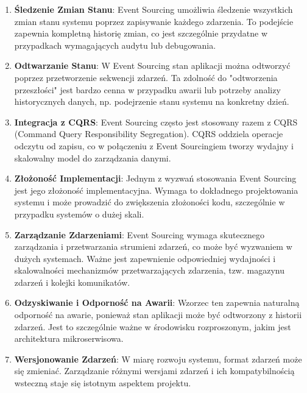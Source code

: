 \begin{enumerate}

    \item \textbf{Śledzenie Zmian Stanu}: Event Sourcing umożliwia śledzenie wszystkich zmian stanu systemu poprzez zapisywanie każdego zdarzenia. To podejście zapewnia kompletną historię zmian, co jest szczególnie przydatne w przypadkach wymagających audytu lub debugowania.

    \item \textbf{Odtwarzanie Stanu}: W Event Sourcing stan aplikacji można odtworzyć poprzez przetworzenie sekwencji zdarzeń. Ta zdolność do "odtworzenia przeszłości" jest bardzo cenna w przypadku awarii lub potrzeby analizy historycznych danych, np. podejrzenie stanu systemu na konkretny dzień.

    \item \textbf{Integracja z CQRS}: Event Sourcing często jest stosowany razem z CQRS (Command Query Responsibility Segregation). CQRS oddziela operacje odczytu od zapisu, co w połączeniu z Event Sourcingiem tworzy wydajny i skalowalny model do zarządzania danymi.

    \item \textbf{Złożoność Implementacji}: Jednym z wyzwań stosowania Event Sourcing jest jego złożoność implementacyjna. Wymaga to dokładnego projektowania systemu i może prowadzić do zwiększenia złożoności kodu, szczególnie w przypadku systemów o dużej skali.

    \item \textbf{Zarządzanie Zdarzeniami}: Event Sourcing wymaga skutecznego zarządzania i przetwarzania strumieni zdarzeń, co może być wyzwaniem w dużych systemach. Ważne jest zapewnienie odpowiedniej wydajności i skalowalności mechanizmów przetwarzających zdarzenia, tzw. magazynu zdarzeń i kolejki komunikatów.

    \item \textbf{Odzyskiwanie i Odporność na Awarii}: Wzorzec ten zapewnia naturalną odporność na awarie, ponieważ stan aplikacji może być odtworzony z historii zdarzeń. Jest to szczególnie ważne w środowisku rozproszonym, jakim jest architektura mikroserwisowa.

    \item \textbf{Wersjonowanie Zdarzeń}: W miarę rozwoju systemu, format zdarzeń może się zmieniać. Zarządzanie różnymi wersjami zdarzeń i ich kompatybilnością wsteczną staje się istotnym aspektem projektu.

\end{enumerate}

